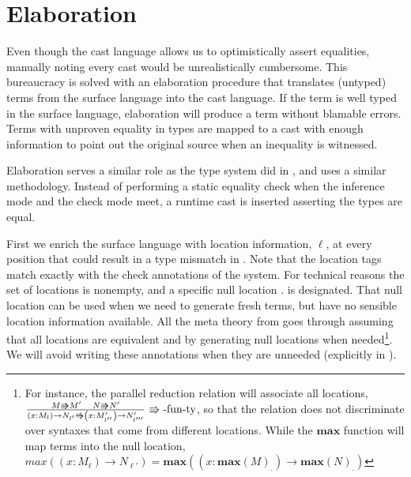 \section{Elaboration}

Even though the cast language allows us to optimistically assert equalities, manually noting every cast would be unrealistically cumbersome.
This bureaucracy is solved with an elaboration procedure that translates (untyped) terms from the surface language into the cast language.
If the term is well typed in the surface language, elaboration will produce a term without blamable errors.
Terms with unproven equality in types are mapped to a cast with enough information to point out the original source when an inequality is witnessed.
 
Elaboration serves a similar role as the \bidir{} type system did in , and uses a similar methodology.
Instead of performing a static equality check when the inference mode and the check mode meet, a runtime cast is inserted asserting the types are equal.

First we enrich the surface language with location information, $\ell$, at every position that could result in a type mismatch in .
Note that the location tags match exactly with the check annotations of the \bidir{} system.
For technical reasons the set of locations is nonempty, and a specific null location $.$ is designated.
That null location can be used when we need to generate fresh terms, but have no sensible location information available.
All the meta theory from  goes through assuming that all locations are equivalent and by generating null locations when needed\footnote{
For instance, the parallel reduction relation will associate all locations,
$\frac{M\Rrightarrow M'\quad N\Rrightarrow N'}{\left(x:M_{l}\right)\rightarrow N_{l'}\Rrightarrow\left(x:M'_{l''}\right)\rightarrow N'_{l'''}}\,\operatorname{\Rrightarrow-fun-ty}$,
so that the relation does not discriminate over syntaxes that come from different locations.
While the $\textbf{max}$ function will map terms into the null location,
$max\left(\left(x:M_{\ell}\right)\rightarrow N_{\ell'}\right)=\textbf{max}\left(\left(x:\textbf{max}\left(M\right)_{.}\right)\rightarrow \textbf{max}\left(N\right)_{.}\right)$
}.
We will avoid writing these annotations when they are unneeded (explicitly in ).

